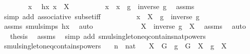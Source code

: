 \begin{isabellebody}
\isanewline
\ \ \ \ \ \ \isamarkupfalse%
\ x\ \isamarkupfalse%
\ hx{\isacharcolon}{\kern0pt}\ {\isachardoublequoteopen}x\ {\isasymin}\ X{\isachardoublequoteclose}\isanewline
\ \ \ \ \ \ \isamarkupfalse%
\ \isamarkupfalse%
\ {\isachardoublequoteopen}x\ {\isacharequal}{\kern0pt}\ x\ {\isasymcdot}\ g\ {\isasymcdot}\ inverse\ g{\isachardoublequoteclose}\ \isamarkupfalse%
\ assms\ \isamarkupfalse%
\ {\isacharparenleft}{\kern0pt}simp\ add{\isacharcolon}{\kern0pt}\ associative\ subset{\isacharunderscore}{\kern0pt}iff{\isacharparenright}{\kern0pt}\isanewline
\ \ \ \ \ \ \isamarkupfalse%
\ \isamarkupfalse%
\ {\isachardoublequoteopen}x\ {\isasymin}\ {\isacharparenleft}{\kern0pt}X\ {\isasymcdots}\ {\isacharbraceleft}{\kern0pt}g{\isacharbraceright}{\kern0pt}{\isacharparenright}{\kern0pt}\ {\isasymcdots}\ {\isacharbraceleft}{\kern0pt}inverse\ g{\isacharbraceright}{\kern0pt}{\isachardoublequoteclose}\ \isamarkupfalse%
\ assms\ smul{\isachardot}{\kern0pt}simps\ hx\ \isamarkupfalse%
\ auto\isanewline
\ \ \ \ \isamarkupfalse%
\isanewline
\ \ \isamarkupfalse%
\isanewline
\ \ \isamarkupfalse%
\ \isamarkupfalse%
\ {\isachardoublequoteopen}X\ {\isasymcdots}\ {\isacharbraceleft}{\kern0pt}inverse\ g{\isacharbraceright}{\kern0pt}\ {\isacharequal}{\kern0pt}\ X{\isachardoublequoteclose}\ \isamarkupfalse%
\ assms\ \isamarkupfalse%
\ auto\isanewline
\ \ \isamarkupfalse%
\ \isamarkupfalse%
\ {\isacharquery}{\kern0pt}thesis\ \isamarkupfalse%
\ assms\ \isamarkupfalse%
\ {\isacharparenleft}{\kern0pt}simp\ add{\isacharcolon}{\kern0pt}\ smul{\isacharunderscore}{\kern0pt}singleton{\isacharunderscore}{\kern0pt}eq{\isacharunderscore}{\kern0pt}contains{\isacharunderscore}{\kern0pt}nat{\isacharunderscore}{\kern0pt}powers{\isacharparenright}{\kern0pt}\isanewline
{}\isamarkupfalse%
%
\endisatagproof
{\isafoldproof}%
%
\isadelimproof
\isanewline
%
\endisadelimproof
\isanewline
{}\isamarkupfalse%
\ smul{\isacharunderscore}{\kern0pt}singleton{\isacharunderscore}{\kern0pt}eq{\isacharunderscore}{\kern0pt}contains{\isacharunderscore}{\kern0pt}powers{\isacharcolon}{\kern0pt}\isanewline
\ \ \ n\ {\isacharcolon}{\kern0pt}{\isacharcolon}{\kern0pt}\ nat\isanewline
\ \ \ {\isachardoublequoteopen}X\ {\isasymsubseteq}\ G{\isachardoublequoteclose}\ \ {\isachardoublequoteopen}g\ {\isasymin}\ G{\isachardoublequoteclose}\ \ {\isachardoublequoteopen}X\ {\isasymcdots}\ {\isacharbraceleft}{\kern0pt}g{\isacharbraceright}{\kern0pt}\ {\isacharequal}{\kern0pt}\ X{\isachardoublequoteclose}\isanewline

\end{isabellebody}
